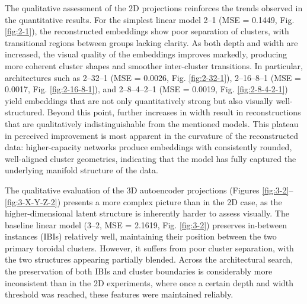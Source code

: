 The qualitative assessment of the 2D projections reinforces the trends observed in the quantitative results. For the simplest linear model 2–1 (MSE = 0.1449, Fig. \ref{fig:2-1}), the reconstructed embeddings show poor separation of clusters, with transitional regions between groups lacking clarity. As both depth and width are increased, the visual quality of the embeddings improves markedly, producing more coherent cluster shapes and smoother inter-cluster transitions. In particular, architectures such as 2–32–1 (MSE = 0.0026, Fig. \ref{fig:2-32-1}), 2–16–8–1 (MSE = 0.0017, Fig. \ref{fig:2-16-8-1}), and 2–8–4–2–1 (MSE = 0.0019, Fig. \ref{fig:2-8-4-2-1}) yield embeddings that are not only quantitatively strong but also visually well-structured. Beyond this point, further increases in width result in reconstructions that are qualitatively indistinguishable from the mentioned models. This plateau in perceived improvement is most apparent in the curvature of the reconstructed data: higher-capacity networks produce embeddings with consistently rounded, well-aligned cluster geometries, indicating that the model has fully captured the underlying manifold structure of the data.

The qualitative evaluation of the 3D autoencoder projections (Figures \ref{fig:3-2}–\ref{fig:3-X-Y-Z-2}) presents a more complex picture than in the 2D case, as the higher-dimensional latent structure is inherently harder to assess visually. The baseline linear model (3–2, MSE = 2.1619, Fig. \ref{fig:3-2}) preserves in-between instances (IBIs) relatively well, maintaining their position between the two primary toroidal clusters. However, it suffers from poor cluster separation, with the two structures appearing partially blended. Across the architectural search, the preservation of both IBIs and cluster boundaries is considerably more inconsistent than in the 2D experiments, where once a certain depth and width threshold was reached, these features were maintained reliably. 

